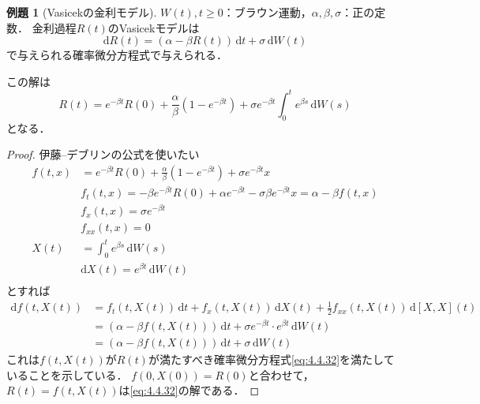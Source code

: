 \documentclass[a4paper, lualatex, ja=standard]{bxjsarticle}
\theoremstyle{definition}
\newtheorem{expl}[thm]{例題}
\newcommand{\diff}{\mathrm{d}}
\begin{document}
\begin{expl}[Vasicekの金利モデル]
  $W(t),t\geq0$：ブラウン運動，$\alpha,\beta,\sigma$：正の定数．
  金利過程$R(t)$のVasicekモデルは
  \begin{equation}
    \diff R(t)=(\alpha-\beta R(t))\,\diff t + \sigma\,\diff W(t)
  \end{equation}
  で与えられる確率微分方程式で与えられる．

  この解は
  \begin{equation}
    R(t) = e^{-\beta t}R(0) + \frac{\alpha}{\beta}(1-e^{-\beta t}) + \sigma e^{-\beta t}\int_0^t e^{\beta s}\,\diff W(s)
    \label{eq:4.4.32}
  \end{equation}
  となる．
  \begin{proof}
    伊藤--デブリンの公式を使いたい
    \begin{align*}
      f(t,x) &= e^{-\beta t}R(0) + \frac{\alpha}{\beta}(1-e^{-\beta t}) + \sigma e^{-\beta t}x\\
      &f_t(t,x) = -\beta e^{-\beta t}R(0) + \alpha e^{-\beta t} - \sigma\beta e^{-\beta t}x = \alpha - \beta f(t,x)\\
      &f_x(t,x) = \sigma e^{-\beta t}\\
      &f_{xx}(t,x) = 0\\
      X(t) &= \int_0^t e^{\beta s}\,\diff W(s)\\
      &\diff X(t) = e^{\beta t}\,\diff W(t)\\
    \end{align*}
    とすれば
    \begin{align*}
      \diff f(t, X(t)) &= f_t(t,X(t))\,\diff t + f_x(t,X(t))\,\diff X(t) + \frac{1}{2}f_{xx}(t,X(t))\,\diff [X,X](t)\\
      &= (\alpha-\beta f(t,X(t)))\,\diff t + \sigma e^{-\beta t}\cdot e^{\beta t}\,\diff W(t)\\
      &= (\alpha-\beta f(t,X(t)))\,\diff t + \sigma\,\diff W(t)
    \end{align*}
    これは$f(t,X(t))$が$R(t)$が満たすべき確率微分方程式\eqref{eq:4.4.32}を満たしていることを示している．
    $f(0,X(0))=R(0)$と合わせて，$R(t)=f(t,X(t))$は\eqref{eq:4.4.32}の解である．
  \end{proof}


\end{expl}
\end{document}
